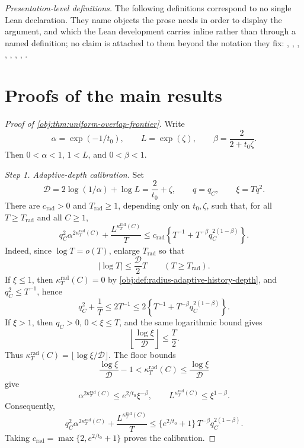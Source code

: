 \documentclass[11pt]{article}
\begin{document}
\emph{Presentation-level definitions.} The following definitions correspond to no single Lean declaration. They name objects the prose needs in order to display the argument, and which the Lean development carries inline rather than through a named definition; no claim is attached to them beyond the notation they fix: , , , , , , , .


\section{Proofs of the main results}\label{sec:deferred-proofs}

\begin{proof}[Proof of \cref{obj:thm:uniform-overlap-frontier}]
Write
\[
\alpha=\exp(-1/t_0),\qquad L=\exp(\zeta),\qquad
\beta=\frac{2}{2+t_0\zeta}.
\]
Then \(0<\alpha<1\), \(1<L\), and \(0<\beta<1\).

\emph{Step 1. Adaptive-depth calibration.}
Set
\[
\mathcal D=2\log(1/\alpha)+\log L=\frac{2}{t_0}+\zeta,
\qquad
q=q_C,\qquad \xi=Tq^2 .
\]
There are \(c_{\mathrm{rad}}>0\) and \(T_{\mathrm{rad}}\ge1\), depending only on
\(t_0,\zeta\), such that, for all \(T\ge T_{\mathrm{rad}}\) and all \(C\ge1\),
\[
q_C^2\alpha^{2\kappa_T^{\mathrm{rad}}(C)}
+\frac{L^{\kappa_T^{\mathrm{rad}}(C)}}{T}
\le
c_{\mathrm{rad}}
\left\{
T^{-1}+T^{-\beta}q_C^{2(1-\beta)}
\right\}.
\]
Indeed, since \(\log T=o(T)\), enlarge \(T_{\mathrm{rad}}\) so that
\[
|\log T|\le \frac{\mathcal D}{2}T
\qquad (T\ge T_{\mathrm{rad}}).
\]
If \(\xi\le1\), then \(\kappa_T^{\mathrm{rad}}(C)=0\) by
\cref{obj:def:radius-adaptive-history-depth}, and \(q_C^2\le T^{-1}\), hence
\[
q_C^2+\frac1T
\le
2T^{-1}
\le
2\left\{
T^{-1}+T^{-\beta}q_C^{2(1-\beta)}
\right\}.
\]
If \(\xi>1\), then \(q_C>0\), \(0<\xi\le T\), and the same logarithmic bound gives
\[
\left\lfloor\frac{\log \xi}{\mathcal D}\right\rfloor\le \frac T2 .
\]
Thus \(\kappa_T^{\mathrm{rad}}(C)=\lfloor\log\xi/\mathcal D\rfloor\). The floor
bounds
\[
\frac{\log\xi}{\mathcal D}-1
<
\kappa_T^{\mathrm{rad}}(C)
\le
\frac{\log\xi}{\mathcal D}
\]
give
\[
\alpha^{2\kappa_T^{\mathrm{rad}}(C)}
\le
e^{2/t_0}\xi^{-\beta},
\qquad
L^{\kappa_T^{\mathrm{rad}}(C)}
\le
\xi^{1-\beta}.
\]
Consequently,
\[
q_C^2\alpha^{2\kappa_T^{\mathrm{rad}}(C)}
+\frac{L^{\kappa_T^{\mathrm{rad}}(C)}}{T}
\le
\{e^{2/t_0}+1\}\,T^{-\beta}q_C^{2(1-\beta)}.
\]
Taking \(c_{\mathrm{rad}}=\max\{2,e^{2/t_0}+1\}\) proves the calibration. %


\end{proof}
\end{document}
